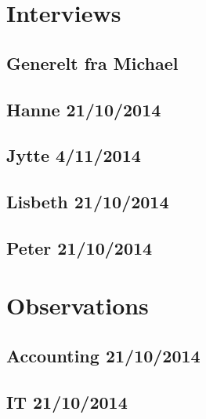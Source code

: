 \chapter{Interviews}
\section{Generelt fra Michael}

\section{Hanne 21/10/2014}

\section{Jytte 4/11/2014}

\section{Lisbeth 21/10/2014}

\section{Peter 21/10/2014}

\chapter{Observations}
\section{Accounting 21/10/2014}

\section{IT 21/10/2014}

